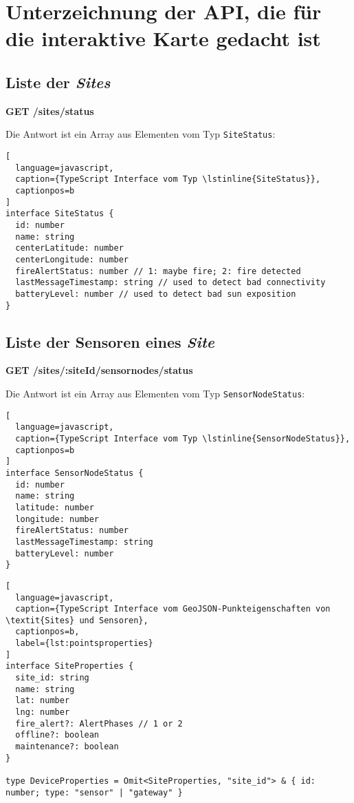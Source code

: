 \section{Unterzeichnung der API, die für die interaktive Karte gedacht ist} \label{appendix:map-api}
\subsection{Liste der \textit{Sites}}

\textbf{GET /sites/status}

Die Antwort ist ein Array aus Elementen vom Typ \lstinline{SiteStatus}:

\begin{lstlisting}[
  language=javascript,
  caption={TypeScript Interface vom Typ \lstinline{SiteStatus}},
  captionpos=b
]
interface SiteStatus {
  id: number
  name: string
  centerLatitude: number
  centerLongitude: number
  fireAlertStatus: number // 1: maybe fire; 2: fire detected
  lastMessageTimestamp: string // used to detect bad connectivity
  batteryLevel: number // used to detect bad sun exposition
}
\end{lstlisting}

\subsection{Liste der Sensoren eines \textit{Site}}

\textbf{GET /sites/:siteId/sensornodes/status}

Die Antwort ist ein Array aus Elementen vom Typ \lstinline{SensorNodeStatus}:

\begin{lstlisting}[
  language=javascript,
  caption={TypeScript Interface vom Typ \lstinline{SensorNodeStatus}},
  captionpos=b
]
interface SensorNodeStatus {
  id: number
  name: string
  latitude: number
  longitude: number
  fireAlertStatus: number
  lastMessageTimestamp: string
  batteryLevel: number
}
\end{lstlisting}

\begin{lstlisting}[
  language=javascript,
  caption={TypeScript Interface vom GeoJSON-Punkteigenschaften von \textit{Sites} und Sensoren},
  captionpos=b,
  label={lst:pointsproperties}
]
interface SiteProperties {
  site_id: string
  name: string
  lat: number
  lng: number
  fire_alert?: AlertPhases // 1 or 2
  offline?: boolean
  maintenance?: boolean
}

type DeviceProperties = Omit<SiteProperties, "site_id"> & { id: number; type: "sensor" | "gateway" }
\end{lstlisting}